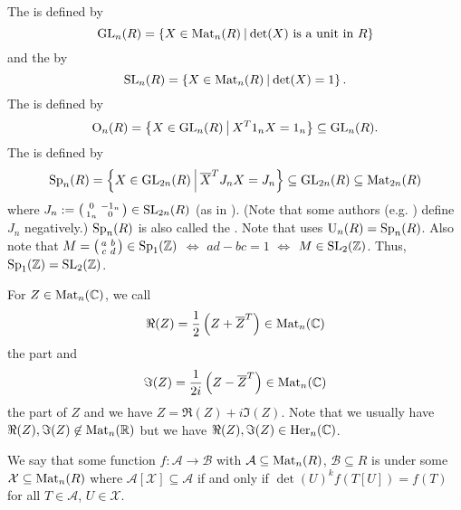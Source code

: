The  is defined by
\[ \GL_n(R) = \Set{X \in \M_n(R)}{\text{$\det(X)$ is a unit in $R$}} \]
and the  by
\[ \SL_n(R) = \Set{X \in \M_n(R)}{\det(X) = 1} . \] %
The  is defined by
\[ \Orth_n(R) = \Set{X \in \GL_n(R)}{X^T 1_n X = 1_n} \subseteq \GL_n(R) . \] %
The  is defined by
\[ \Sp_n(R) = \Set{X \in \GL_{2n}(R)}{\overline{X}^T J_n X = J_n} \subseteq \GL_{2n}(R) \subseteq \M_{2n}(R) \] %
where $J_n := \left( \begin{smallmatrix} 0 & -1_n \\ 1_n & 0 \end{smallmatrix} \right) \in \operatorname{SL}_{2n}(R)$ (as in \cite{Dern01Herm}). (Note that some authors (e.g. \cite{PoorYuen07Comp}) define $J_n$ negatively.)
$\operatorname{Sp}_n(R)$ is also called the . Note that \cite{Dern01Herm} uses $\operatorname{U}_n(R) = \operatorname{Sp}_n(R)$.
Also note that $M = \left( \begin{smallmatrix} a & b \\ c & d \end{smallmatrix} \right) \in \operatorname{Sp}_1(\mathbb{Z})$ $\Leftrightarrow$ $ad - bc = 1$ $\Leftrightarrow$ $M \in \operatorname{SL}_2(\mathbb{Z})$. Thus, $\operatorname{Sp}_1(\mathbb{Z}) = \operatorname{SL}_2(\mathbb{Z})$. %

For $Z \in \operatorname{Mat}_n(\mathbb{C})$, we call
\[ \Re(Z) = \frac{1}{2} \left(Z + \overline{Z}^{T}\right) \in \operatorname{Mat}_n(\mathbb{C}) \]
the  part and
\[ \Im(Z) = \frac{1}{2i} \left(Z - \overline{Z}^{T}\right)  \in \operatorname{Mat}_n(\mathbb{C}) \]
the  part of $Z$ and we have $Z = \Re(Z) + i \Im(Z)$.
Note that we usually have $\Re(Z),\Im(Z) \not\in \operatorname{Mat}_n(\mathbb{R})$ but we have $\Re(Z),\Im(Z) \in \operatorname{Her}_n(\mathbb{C})$.

We say that some function $f \colon \mathcal{A} \rightarrow \mathcal{B}$ with $\mathcal{A} \subseteq \operatorname{Mat}_n(R)$, $\mathcal{B} \subseteq R$ is  under some $\mathcal{X} \subseteq \operatorname{Mat}_n(R)$ where $\mathcal{A}[\mathcal{X}] \subseteq \mathcal{A}$ if and only if $\det(U)^k f(T[U]) = f(T)$ for all $T \in \mathcal{A}$, $U \in \mathcal{X}$.


